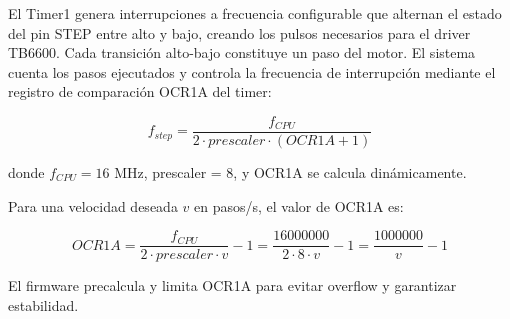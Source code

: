 El Timer1 genera interrupciones a frecuencia configurable que alternan el estado del pin STEP entre alto y bajo, creando los pulsos necesarios para el driver TB6600. Cada transición alto-bajo constituye un paso del motor. El sistema cuenta los pasos ejecutados y controla la frecuencia de interrupción mediante el registro de comparación OCR1A del timer:

\begin{equation}
f_{step} = \frac{f_{CPU}}{2 \cdot prescaler \cdot (OCR1A + 1)}
\end{equation}

donde $f_{CPU} = 16$ MHz, prescaler = 8, y OCR1A se calcula dinámicamente.

Para una velocidad deseada $v$ en pasos/s, el valor de OCR1A es:

\begin{equation}
OCR1A = \frac{f_{CPU}}{2 \cdot prescaler \cdot v} - 1 = \frac{16000000}{2 \cdot 8 \cdot v} - 1 = \frac{1000000}{v} - 1
\end{equation}

El firmware precalcula y limita OCR1A para evitar overflow y garantizar estabilidad.